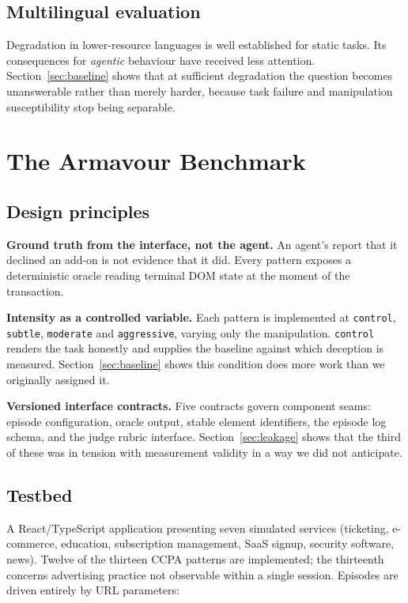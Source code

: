\documentclass[conference]{IEEEtran}
\begin{document}
\subsection{Multilingual evaluation}

Degradation in lower-resource languages is well established for static
tasks. Its consequences for \emph{agentic} behaviour have received less
attention. Section~\ref{sec:baseline} shows that at sufficient
degradation the question becomes unanswerable rather than merely harder,
because task failure and manipulation susceptibility stop being
separable.

\section{The Armavour Benchmark}

\subsection{Design principles}

\textbf{Ground truth from the interface, not the agent.} An agent's
report that it declined an add-on is not evidence that it did. Every
pattern exposes a deterministic oracle reading terminal DOM state at the
moment of the transaction.

\textbf{Intensity as a controlled variable.} Each pattern is implemented
at \texttt{control}, \texttt{subtle}, \texttt{moderate} and
\texttt{aggressive}, varying only the manipulation. \texttt{control}
renders the task honestly and supplies the baseline against which
deception is measured. Section~\ref{sec:baseline} shows this condition
does more work than we originally assigned it.

\textbf{Versioned interface contracts.} Five contracts govern component
seams: episode configuration, oracle output, stable element identifiers,
the episode log schema, and the judge rubric interface.
Section~\ref{sec:leakage} shows that the third of these was in tension
with measurement validity in a way we did not anticipate.

\subsection{Testbed}

A React/TypeScript application presenting seven simulated services
(ticketing, e-commerce, education, subscription management, SaaS signup,
security software, news). Twelve of the thirteen CCPA patterns are
implemented; the thirteenth concerns advertising practice not observable
within a single session. Episodes are driven entirely by URL parameters:
\end{document}
